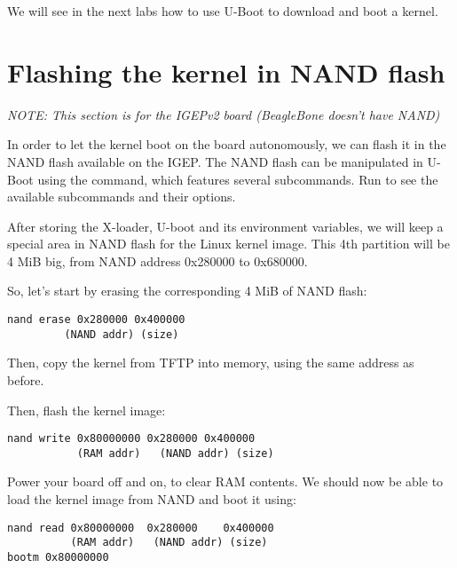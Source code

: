 We will see in the next labs how to use U-Boot to download and boot a kernel.

\section{Flashing the kernel in NAND flash}

\emph{NOTE: This section is for the IGEPv2 board (BeagleBone doesn't have NAND)}

In order to let the kernel boot on the board autonomously, we can
flash it in the NAND flash available on the IGEP. The NAND flash can
be manipulated in U-Boot using the  command, which
features several subcommands. Run  to see the
available subcommands and their options.

After storing the X-loader, U-boot and its environment variables, we
will keep a special area in NAND flash for the Linux kernel image.
This 4th partition will be 4 MiB big, from NAND address
0x280000 to 0x680000.

So, let's start by erasing the corresponding 4 MiB of NAND flash:

\begin{verbatim}
nand erase 0x280000 0x400000
         (NAND addr) (size)
\end{verbatim}

Then, copy the kernel from TFTP into memory, using the same address as
before.

Then, flash the kernel image:

\begin{verbatim}
nand write 0x80000000 0x280000 0x400000
           (RAM addr)   (NAND addr) (size)
\end{verbatim}

Power your board off and on, to clear RAM contents. We should now be able to load
the kernel image from NAND and boot it using:

\begin{verbatim}
nand read 0x80000000  0x280000    0x400000
          (RAM addr)   (NAND addr) (size)
bootm 0x80000000
\end{verbatim}

